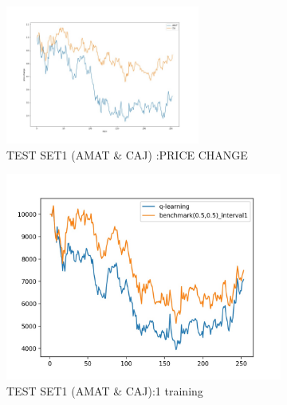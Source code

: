 \begin{figure}[H]
\begin{figure}[H]
\begin{center}
\includegraphics[clip, width=0.7\textwidth]{Graphics/test1_pricechange.jpg} \caption{TEST SET1 (AMAT \& CAJ) :PRICE CHANGE}
\end{center}
\end{figure}
\vspace{0.1cm}
\begin{subfigure}{.5\textwidth}%
\centering
\includegraphics[clip, width=1.1\textwidth]{Graphics/test_KS1_AC_action.jpg} \caption{TEST SET1 (AMAT \& CAJ):1 training} 
\end{subfigure}%
\vspace{0.1cm}
\begin{subfigure}{.5\textwidth}%
\centering

\end{subfigure}
\end{figure}

